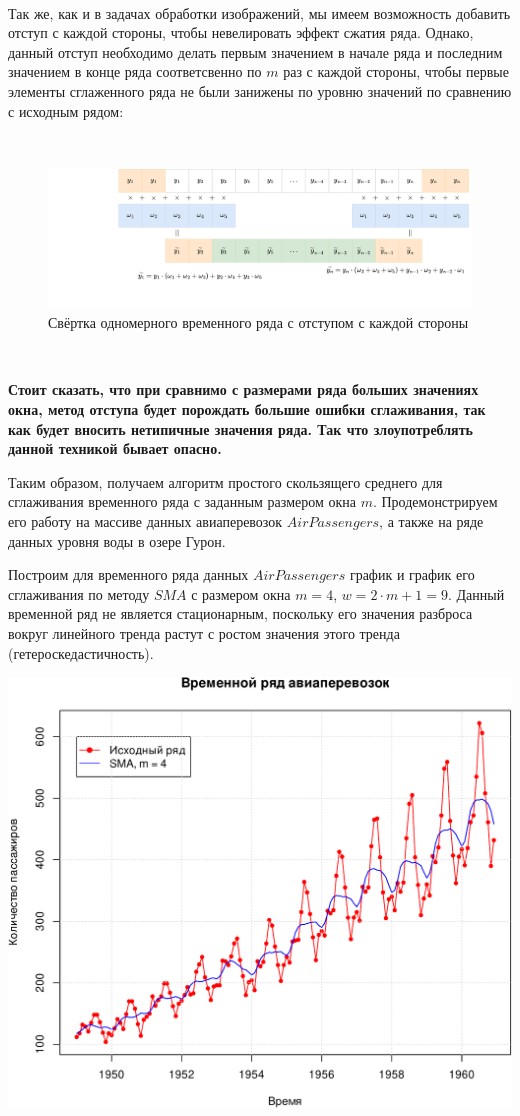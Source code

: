 \documentclass[
]{article}
\begin{document}
\(\ \)

Так же, как и в задачах обработки изображений, мы имеем возможность
добавить отступ с каждой стороны, чтобы невелировать эффект сжатия ряда.
Однако, данный отступ необходимо делать первым значением в начале ряда и
последним значением в конце ряда соответсвенно по \(m\) раз с каждой
стороны, чтобы первые элементы сглаженного ряда не были занижены по
уровню значений по сравнению с исходным рядом:

\(\ \)

\begin{figure}
\centering
\includegraphics{Statistics-Свертка3.drawio.png}
\caption{Свёртка одномерного временного ряда с отступом с каждой
стороны}
\end{figure}

\(\ \)

\textbf{Стоит сказать, что при сравнимо с размерами ряда больших
значениях окна, метод отступа будет порождать большие ошибки
сглаживания, так как будет вносить нетипичные значения ряда. Так что
злоупотреблять данной техникой бывает опасно.}

Таким образом, получаем алгоритм простого скользящего среднего для
сглаживания временного ряда с заданным размером окна \(m\).
Продемонстрируем его работу на массиве данных авиаперевозок
\(AirPassengers\), а также на ряде данных уровня воды в озере Гурон.

Построим для временного ряда данных \(AirPassengers\) график и график
его сглаживания по методу \(SMA\) с размером окна \(m = 4\),
\(w = 2\cdot m + 1 = 9\). Данный временной ряд не является стационарным,
поскольку его значения разброса вокруг линейного тренда растут с ростом
значения этого тренда (гетероскедастичность).

\begin{center}\includegraphics[width=0.6\linewidth]{Prac6_files/figure-latex/unnamed-chunk-4-1} \end{center}
\end{document}
